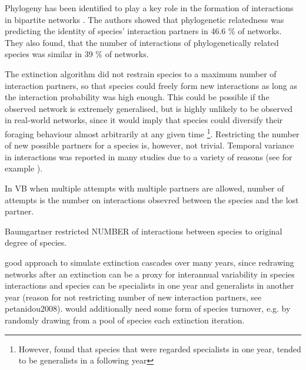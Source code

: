 \documentclass[12pt,a4paper]{article}
\begin{document}
Phylogeny has been identified to play a key role in the formation of interactions in bipartite networks \parencite{Rezende2007}. The authors showed that phylogenetic relatedness was predicting the identity of species' interaction partners in 46.6 \% of networks. They also found, that the number of interactions of phylogenetically related species was similar in 39 \% of networks.

The extinction algorithm did not restrain species to a maximum number of interaction partners, so that species could freely form new interactions as long as the interaction probability was high enough. This could be possible if the observed network is extremely generalised, but is highly unlikely to be observed in real-world networks, since it would imply that species could diversify their foraging behaviour almost arbitrarily at any given time \footnote{However, \citeauthor{Petanidou2008} found that species that were regarded specialists in one year, tended to be generalists in a following year}. Restricting the number of new possible partners for a species is, however, not trivial. Temporal variance in interactions was reported in many studies due to a variety of reasons (see for example \cite{Olesen2008, CaraDonna2017, Schwarz2021}).

In VB when multiple attempts with multiple partners are allowed, number of attempts is the number on interactions obsevred between the species and the lost partner.

Baumgartner restricted NUMBER of interactions between species to original degree of species.


good approach to simulate extinction cascades over many years, since redrawing networks after an extinction can be a proxy for interannual variability in species interactions and species can be specialists in one year and generalists in another year (reason for not restricting number of new interaction partners, see petanidou2008). would additionally need some form of species turnover, e.g. by randomly drawing from a pool of species each extinction iteration.
\end{document}
